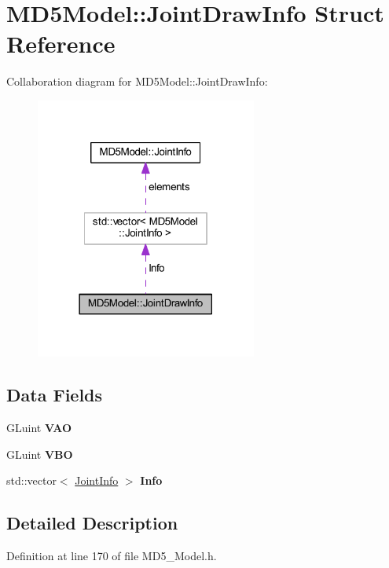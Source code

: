 \hypertarget{struct_m_d5_model_1_1_joint_draw_info}{}\section{M\+D5\+Model\+:\+:Joint\+Draw\+Info Struct Reference}
\label{struct_m_d5_model_1_1_joint_draw_info}


Collaboration diagram for M\+D5\+Model\+:\+:Joint\+Draw\+Info\+:
\nopagebreak
\begin{figure}[H]
\begin{center}
\leavevmode
\includegraphics[width=206pt]{struct_m_d5_model_1_1_joint_draw_info__coll__graph}
\end{center}
\end{figure}
\subsection*{Data Fields}
\begin{DoxyCompactItemize}
\item 
G\+Luint {\bfseries V\+AO}\hypertarget{struct_m_d5_model_1_1_joint_draw_info_accb2b4c2c2fbf73f93d8109d2a749efb}{}\label{struct_m_d5_model_1_1_joint_draw_info_accb2b4c2c2fbf73f93d8109d2a749efb}

\item 
G\+Luint {\bfseries V\+BO}\hypertarget{struct_m_d5_model_1_1_joint_draw_info_aa5f0b55afe49b644ab90888278432ff6}{}\label{struct_m_d5_model_1_1_joint_draw_info_aa5f0b55afe49b644ab90888278432ff6}

\item 
std\+::vector$<$ \hyperlink{struct_m_d5_model_1_1_joint_info}{Joint\+Info} $>$ {\bfseries Info}\hypertarget{struct_m_d5_model_1_1_joint_draw_info_acc6911d2241afb5a71d9f040e51a3357}{}\label{struct_m_d5_model_1_1_joint_draw_info_acc6911d2241afb5a71d9f040e51a3357}

\end{DoxyCompactItemize}


\subsection{Detailed Description}


Definition at line 170 of file M\+D5\+\_\+\+Model.\+h.

